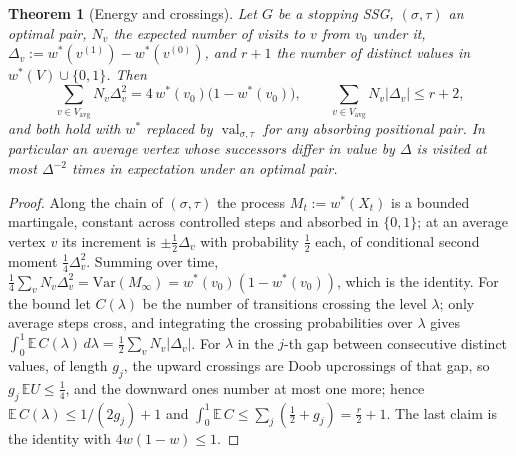 \documentclass[11pt]{article}
\theoremstyle{plain}
\newtheorem{theorem}{Theorem}[section]
\theoremstyle{definition}
\DeclareMathOperator{\val}{val}
\newcommand{\Vavg}{V_{\mathrm{avg}}}
\begin{document}
\begin{theorem}[Energy and crossings]\label{thm:energy}
Let $G$ be a stopping SSG, $(\sigma,\tau)$ an optimal pair, $N_v$ the
expected number of visits to $v$ from $v_0$ under it, $\Delta_v:=
w^\ast(v^{(1)})-w^\ast(v^{(0)})$, and $r+1$ the number of distinct values
in $w^\ast(V)\cup\{0,1\}$. Then
\[
  \sum_{v\in\Vavg}N_v\Delta_v^{2}=4\,w^\ast(v_0)\bigl(1-w^\ast(v_0)\bigr),
  \qquad
  \sum_{v\in\Vavg}N_v|\Delta_v|\le r+2,
\]
and both hold with $w^\ast$ replaced by $\val_{\sigma,\tau}$ for any
absorbing positional pair. In particular an average vertex whose
successors differ in value by $\Delta$ is visited at most $\Delta^{-2}$
times in expectation under an optimal pair.
\end{theorem}

\begin{proof}
Along the chain of $(\sigma,\tau)$ the process $M_t:=w^\ast(X_t)$ is a
bounded martingale, constant across controlled steps and absorbed in
$\{0,1\}$; at an average vertex $v$ its increment is $\pm\tfrac12\Delta_v$
with probability $\tfrac12$ each, of conditional second moment
$\tfrac14\Delta_v^{2}$. Summing over time,
$\tfrac14\sum_vN_v\Delta_v^{2}=\mathrm{Var}(M_\infty)=w^\ast(v_0)(1-w^\ast(v_0))$,
which is the identity. For the bound let $C(\lambda)$ be the number of
transitions crossing the level $\lambda$; only average steps cross, and
integrating the crossing probabilities over $\lambda$ gives
$\int_0^1\mathbb E\,C(\lambda)\,d\lambda=\tfrac12\sum_vN_v|\Delta_v|$. For
$\lambda$ in the $j$-th gap between consecutive distinct values, of length
$g_j$, the upward crossings are Doob upcrossings of that gap, so
$g_j\,\mathbb EU\le\tfrac14$, and the downward ones number at most one
more; hence $\mathbb E\,C(\lambda)\le1/(2g_j)+1$ and
$\int_0^1\mathbb E\,C\le\sum_j(\tfrac12+g_j)=\tfrac r2+1$. The last claim
is the identity with $4w(1-w)\le1$.
\end{proof}
\end{document}
